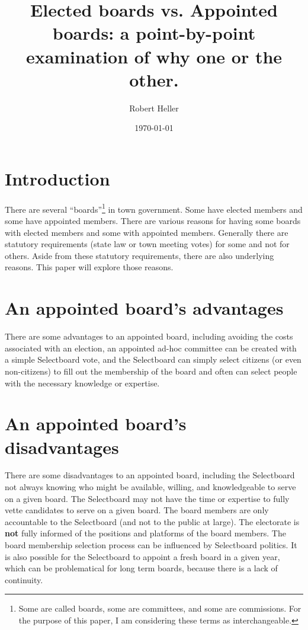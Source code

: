 \documentclass[12pt]{article}
\title{Elected boards vs. Appointed boards: a point-by-point examination of why one or the other.}
\author{Robert Heller}
\date{\today}
\begin{document}
\maketitle

\tableofcontents

\section{Introduction}

There are several ``boards''\footnote{Some are called boards, some are
committees, and some are commissions. For the purpose of this paper, I am
considering these terms as interchangeable.} in town government. Some have
elected members and some have appointed members\cite{Classroom2017}. There are
various reasons for having some boards with elected members and some with
appointed members. Generally there are statutory requirements (state law or
town meeting votes) for some and not for others. Aside from these statutory
requirements, there are also underlying reasons. This paper will explore those
reasons.

\section{An appointed board's advantages}

There are some advantages to an appointed board, including avoiding the costs 
associated with an election, an appointed ad-hoc committee can be created with 
a simple Selectboard vote, and the Selectboard can simply select citizens (or 
even non-citizens) to fill out the membership of the board and often can 
select people with the necessary knowledge or expertise.

\section{An appointed board's disadvantages}

There are some disadvantages to an appointed board, including the Selectboard
not always knowing who might be available, willing, and knowledgeable to serve
on a given board. The Selectboard may not have the time or expertise to fully
vette candidates to serve on a given board. The board members are only
accountable to the Selectboard (and not to the public at large). The
electorate is \textbf{not} fully informed of the positions and platforms of
the board members. The board membership selection process can be influenced by
Selectboard politics.  It is also possible for the Selectboard to appoint a 
fresh board in a given year, which can be problematical for long term boards, 
because there is a lack of continuity.
\end{document}
